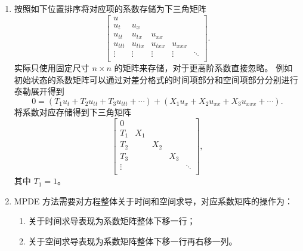 \begin{enumerate}
    \item 按照如下位置排序将对应项的系数存储为下三角矩阵
          \[
              \begin{bmatrix}
                  u                                              \\
                  u_t     & u_x                                  \\
                  u_{tt}  & u_{tx}  & u_{xx}                     \\
                  u_{ttt} & u_{ttx} & u_{txx} & u_{xxx}          \\
                  \vdots  & \vdots  & \vdots  & \vdots  & \ddots \\
              \end{bmatrix}.
          \]
          实际只使用固定尺寸 $n \times n$ 的矩阵来存储，对于更高阶系数直接忽略。
          例如初始状态的系数矩阵可以通过对差分格式的时间项部分和空间项部分分别进行泰勒展开得到
          \[
              0 =
              \left(
              T_1 u_t + T_2 u_{tt} + T_3 u_{ttt} + \cdots
              \right)
              +
              \left(
              X_1 u_x + X_2 u_{xx} + X_3 u_{xxx} + \cdots
              \right).
          \]
          将系数对应存储得到下三角矩阵
          \[
              \begin{bmatrix}
                  0                                 \\
                  T_1    & X_1                      \\
                  T_2    &     & X_2                \\
                  T_3    &     &     & X_3          \\
                  \vdots &     &     &     & \ddots \\
              \end{bmatrix},
          \]
          其中 $T_1=1$。

    \item MPDE 方法需要对方程整体关于时间和空间求导，对应系数矩阵的操作为：
          \begin{enumerate}
              \item 关于时间求导表现为系数矩阵整体下移一行；
              \item 关于空间求导表现为系数矩阵整体下移一行再右移一列。
          \end{enumerate}


\end{enumerate}
